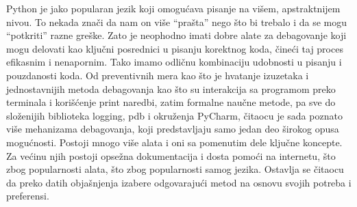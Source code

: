 \documentclass[a4paper]{article}
\begin{document}
Python je jako popularan jezik koji omogućava pisanje na višem, apstraktnijem nivou. To nekada znači da nam on više “prašta” nego što bi trebalo i da se mogu “potkriti” razne greške. Zato je neophodno imati dobre alate za debagovanje koji mogu delovati kao ključni posrednici u pisanju korektnog koda, čineći taj proces efikasnim i nenapornim. Tako imamo odličnu kombinaciju udobnosti u pisanju i pouzdanosti koda. Od preventivnih mera kao što je hvatanje izuzetaka i jednostavnijih metoda debagovanja kao što su interakcija sa programom preko terminala i korišćenje print naredbi, zatim formalne naučne metode, pa sve do složenijih biblioteka logging, pdb i okruženja PyCharm, čitaocu je sada poznato više mehanizama debagovanja, koji predstavljaju samo jedan deo širokog opusa mogućnosti. Postoji mnogo više alata i oni sa pomenutim dele ključne koncepte. Za većinu njih postoji opsežna dokumentacija i dosta pomoći na internetu, što zbog popularnosti alata, što zbog popularnosti samog jezika. Ostavlja se čitaocu da preko datih objašnjenja izabere odgovarajući metod na osnovu svojih potreba i preferensi.


\appendix
 


\newpage

\appendix
\end{document}
